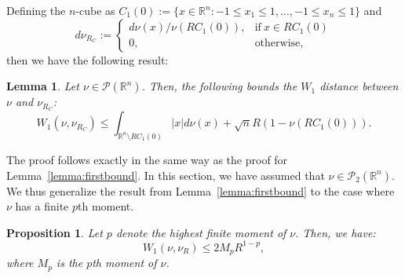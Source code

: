 \documentclass{amsart}
\theoremstyle{lemma}
\newtheorem{lemma}[theorem]{Lemma}
\newtheorem{proposition}[theorem]{Proposition}
\theoremstyle{remark}
\begin{document}
Defining the $n$-cube as $C_{1}(0) := \{x \in \mathbb{R}^n : -1 \leq x_1 \leq 1, \dots, -1 \leq x_n \leq 1 \}$ and
\begin{equation}
d \nu_{R_{C}} := \begin{cases}
d \nu(x) / \nu(RC_1(0)), & \text{if} \ x \in RC_1(0) \\
0, & \text{otherwise},
\end{cases}
\end{equation}
then we have the following result:
\begin{lemma}
Let $\nu \in \mathcal{P}(\mathbb{R}^n)$. Then, the following bounds the $W_1$ distance between $\nu$ and $\nu_{R_{C}}$:
\begin{equation}\label{eq:generalbound}
W_1(\nu, \nu_{R_{C}}) \leq \int_{\mathbb{R}^n \setminus RC_{1}(0)} \vert x \vert d\nu(x) + \sqrt{n} R(1-\nu(RC_1(0))).
\end{equation}
\end{lemma}
The proof follows exactly in the same way as the proof for Lemma~\ref{lemma:firstbound}. In this section, we have assumed that $\nu \in \mathcal{P}_2(\mathbb{R}^n)$. We thus generalize the result from Lemma~\ref{lemma:firstbound} to the case where $\nu$ has a finite $p$th moment.

\begin{proposition}\label{lemma:bounds1}
Let $p$ denote the highest finite moment of $\nu$. Then, we have:
\begin{equation}
W_1 (\nu, \nu_{R}) \leq 2M_p R^{1 - p},
\end{equation}
where $M_p$ is the $p$th moment of $\nu$.
\end{proposition}
\end{document}
